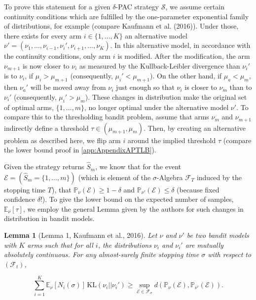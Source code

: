 \documentclass[11pt,]{article}
\newtheorem{lemma}{Lemma}
\newcommand{\KL}{\,\text{KL}}
\begin{document}
To prove this statement for a given \(\delta\)-PAC strategy
\(\mathcal{S}\), we assume certain continuity conditions which are
fulfilled by the one-parameter exponential family of distributions, for
example (compare Kaufmann et al. (2016)). Under those, there exists for
every arm \(i \in \{1, \dots, K\}\) an alternative model
\(\nu' = (\nu_1, \dots, \nu_{i-1}, \nu_i', \nu_{i+1}, \dots, \nu_K)\).
In this alternative model, in accordance with the continuity conditions,
only arm \(i\) is modified. After the modification, the arm
\(\nu_{m+1}\) is now closer to \(\nu_i\) as measured by the
Kullback-Leibler divergence than \(\nu_i'\) is to \(\nu_i\), if
\(\mu_i > \mu_{m+1}\) (consequently, \(\mu_i' < \mu_{m+1}\)). On the
other hand, if \(\mu_a < \mu_{m}\), then \(\nu_a'\) will be moved away
from \(\nu_i\) just enough so that \(\nu_i\) is closer to \(\nu_m\) than
to \(\nu_i'\) (consequently, \(\mu_i' > \mu_m\)). These changes in
distribution make the original set of optimal arms, \(\{1,\dots,m\}\),
no longer optimal under the alternative model \(\nu'\). To compare this
to the thresholding bandit problem, assume that arms \(\nu_{m}\) and
\(\nu_{m+1}\) indirectly define a threshold
\(\tau \in (\mu_{m+1},\mu_m)\). Then, by creating an alternative problem
as described here, we flip arm \(i\) around the implied threshold
\(\tau\) (compare the lower bound proof in \autoref{app:AppendixAPTLB}).

Given the strategy returns \(\hat{S}_m\), we know that for the event
\(\mathcal{E} = (\hat{S}_m = \{1, \dots, m\})\) (which is element of the
\(\sigma\)-Algebra \(\mathcal{F}_{T}\) induced by the stopping time
\(T\)), that \(\mathbb{P}_{\nu}(\mathcal{E}) \geq 1-\delta\) and
\(\mathbb{P}_{\nu'}(\mathcal{E}) \leq \delta\) (because fixed confidence
\(\delta\)!). To give the lower bound on the expected number of samples,
\(\mathbb{E}_{\nu}[\tau]\), we employ the general Lemma given by the
authors for such changes in distribution in bandit models.

\begin{lemma}[Lemma 1, Kaufmann et al., 2016] \label{theorem:KaufmannEtAlLemma1}
Let $\nu$ and $\nu'$ be two bandit models with $K$ arms such that for all $i$, the distributions $\nu_i$ and $\nu_i'$ are mutually absolutely continuous. For any almost-surely finite stopping time $\sigma$ with respect to $(\mathcal{F}_t)$,

\begin{equation*}
\sum_{i=1}^{K} \mathbb{E}_{\nu} [N_i(\sigma)] \KL(\nu_i|| \nu_i') \geq \sup_{\mathcal{E} \in \mathcal{F}_{\sigma}} d(\mathbb{P}_{\nu}(\mathcal{E}), \mathbb{P}_{\nu'}(\mathcal{E})).
\end{equation*}
\end{lemma}
\end{document}

